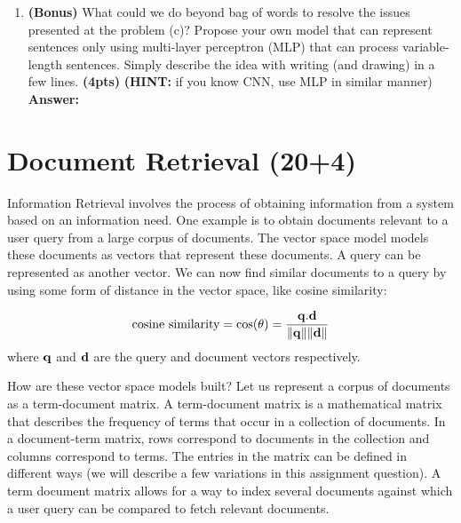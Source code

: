 \documentclass{assignment format}
\newenvironment{answer}{
    {\bf Answer:} \begingroup\color{red}
}{\endgroup}%
\begin{document}
\begin{enumerate}[label=(\alph*)]
\begin{answer}

\end{answer}
\item \textbf{(Bonus)} What could we do beyond bag of words to resolve the issues presented at the problem (c)? Propose your own model that can represent sentences only using multi-layer perceptron (MLP) that can process variable-length sentences. Simply describe the idea with writing (and drawing) in a few lines. \textbf{(4pts)}
\newline
\textbf{(HINT:} if you know CNN, use MLP in similar manner)
\newline
\begin{answer}

\end{answer}
\end{enumerate}

\section{Document Retrieval (20+4)}
Information Retrieval involves the process of obtaining information from a system based on an information need. 
One example is to obtain documents relevant to a user query from a large corpus of documents. 
The vector space model models these documents as vectors that represent these documents. 
A query can be represented as another vector. 
We can now find similar documents to a query by using some form of distance in the vector space, like cosine similarity:

\begin{align*}
    \text{cosine similarity} = \text{cos}(\theta) = \frac{{\bf q}.{\bf d}}{\lVert {\bf q} \rVert \lVert {\bf d} \rVert }
\end{align*}
where ${\bf q}$ and ${\bf d}$ are the query and document vectors respectively. 

How are these vector space models built?
Let us represent a corpus of documents as a term-document matrix.
A term-document matrix is a mathematical matrix that describes the frequency of terms that occur in a collection of documents. In a document-term matrix, rows correspond to documents in the collection and columns correspond to terms. The entries in the matrix can be defined in different ways (we will describe a few variations in this assignment question).
A term document matrix allows for a way to index several documents against which a user query can be compared to fetch relevant documents.
\end{document}
